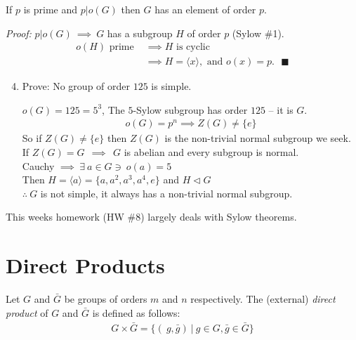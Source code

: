 \setcounter{dummy}{2}
\setcounter{section}{11}
\begin{theorem}
If $p$ is prime and $p|o(G)$ then $G$ has an element of order $p$. \steezybreak

\noindent \textit{Proof:} $p|o(G) \ \implies \ G$ has a subgroup $H$ of order $p$ (Sylow \#1).
\begin{align}
    o(H) \text{ prime }&\implies H \text{ is cyclic }\nonumber \\
    &\implies H=\langle x \rangle, \text{ and }o(x) = p. \ \ \ \blacksquare \nonumber
\end{align}
\end{theorem}
\setcounter{dummy}{2}
\setcounter{section}{12}


\begin{enumerate}
\setcounter{enumi}{3}
    \item Prove: No group of order $125$ is simple. \steezybreak

    \noindent $o(G)=125=5^3$, The $5$-Sylow subgroup has order $125$ -- it is $G$.
    \begin{align}
        o(G)=p^n \implies Z(G)\neq \{e\} \nonumber
    \end{align}
    So if $Z(G)\neq \{e\}$ then $Z(G)$ is the non-trivial normal subgroup we seek. \\
    If $Z(G)=G \ \ \implies \ \ G$ is abelian and every subgroup is normal. \\
    Cauchy $\implies \ \exists \ a\in G \ni \ o(a)=5$ \\
    Then $H=\langle a \rangle = \{a,a^2,a^3,a^4,e\}$ and $H\triangleleft G$ \\
    $\therefore \ G$ is not simple, it always has a non-trivial normal subgroup.
\end{enumerate}
This weeks homework (HW \#8) largely deals with Sylow theorems.

\section{Direct Products}

\begin{definition}
Let $G$ and $\bar{G}$ be groups of orders $m$ and $n$ respectively. The (external) \textit{direct
product} of $G$ and $\bar{G}$ is defined as follows:
\begin{align}
    G\times \bar{G} = \{(\ g,\bar{g}) \  | \ g\in G, \bar{g}\in \bar{G}\} \nonumber
\end{align}
\end{definition}

